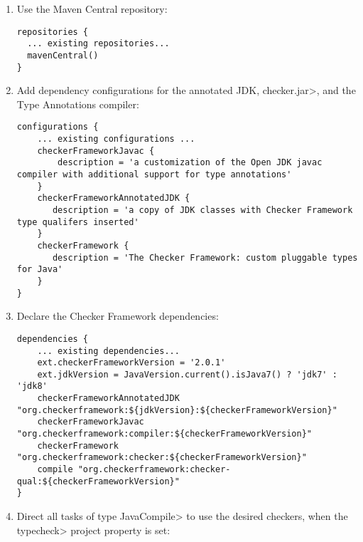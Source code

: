 \begin{enumerate}

\item Use the Maven Central repository:

\begin{Verbatim}
repositories {
  ... existing repositories...
  mavenCentral()
}
\end{Verbatim}

\item Add dependency configurations for the annotated JDK, \<checker.jar>, and the Type Annotations compiler:

\begin{mysmall}
\begin{Verbatim}
configurations {
    ... existing configurations ...
    checkerFrameworkJavac {
        description = 'a customization of the Open JDK javac compiler with additional support for type annotations'
    }
    checkerFrameworkAnnotatedJDK {
       description = 'a copy of JDK classes with Checker Framework type qualifers inserted'
    }
    checkerFramework {
       description = 'The Checker Framework: custom pluggable types for Java'
    }
}
\end{Verbatim}
\end{mysmall}

\item Declare the Checker Framework dependencies:

\begin{mysmall}
\begin{Verbatim}
dependencies {
    ... existing dependencies...
    ext.checkerFrameworkVersion = '2.0.1'
    ext.jdkVersion = JavaVersion.current().isJava7() ? 'jdk7' : 'jdk8'
    checkerFrameworkAnnotatedJDK "org.checkerframework:${jdkVersion}:${checkerFrameworkVersion}"
    checkerFrameworkJavac "org.checkerframework:compiler:${checkerFrameworkVersion}"
    checkerFramework "org.checkerframework:checker:${checkerFrameworkVersion}"
    compile "org.checkerframework:checker-qual:${checkerFrameworkVersion}"
}
\end{Verbatim}
\end{mysmall}

\item Direct all tasks of type \<JavaCompile> to use the desired checkers, when the \<typecheck> project property is set:


\end{enumerate}
